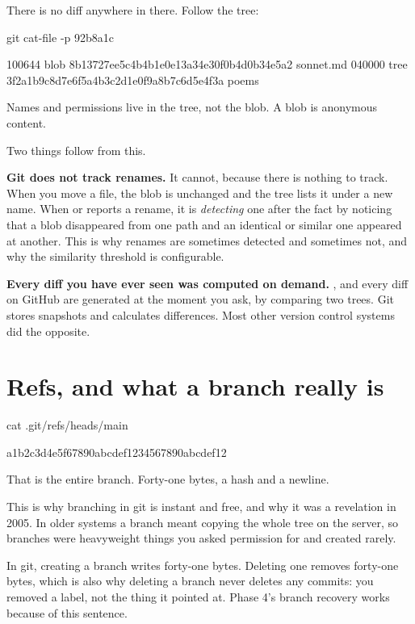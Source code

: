 \documentclass[11pt]{article}
\begin{document}
There is no diff anywhere in there. Follow the tree:

\begin{shell}
git cat-file -p 92b8a1c
\end{shell}

\begin{terminal}
100644 blob 8b13727ee5c4b4b1e0e13a34e30f0b4d0b34e5a2    sonnet.md
040000 tree 3f2a1b9c8d7e6f5a4b3c2d1e0f9a8b7c6d5e4f3a    poems
\end{terminal}

Names and permissions live in the tree, not the blob. A blob is anonymous content.

\begin{deeper}
Two things follow from this.

\textbf{Git does not track renames.} It cannot, because there is nothing to track.
When you move a file, the blob is unchanged and the tree lists it under a new name.
When  or  reports a rename, it is
\emph{detecting} one after the fact by noticing that a blob disappeared from one
path and an identical or similar one appeared at another. This is why renames are
sometimes detected and sometimes not, and why the similarity threshold is
configurable.

\textbf{Every diff you have ever seen was computed on demand.} ,
 and every diff on GitHub are generated at the moment you ask, by
comparing two trees. Git stores snapshots and calculates differences. Most other
version control systems did the opposite.
\end{deeper}

\section{Refs, and what a branch really is}

\begin{shell}
cat .git/refs/heads/main
\end{shell}

\begin{terminal}
a1b2c3d4e5f67890abcdef1234567890abcdef12
\end{terminal}

That is the entire branch. Forty-one bytes, a hash and a newline.

\begin{why}
This is why branching in git is instant and free, and why it was a revelation in
2005. In older systems a branch meant copying the whole tree on the server, so
branches were heavyweight things you asked permission for and created rarely.

In git, creating a branch writes forty-one bytes. Deleting one removes forty-one
bytes, which is also why deleting a branch never deletes any commits: you removed a
label, not the thing it pointed at. Phase 4's branch recovery works because of this
sentence.
\end{why}
\end{document}
